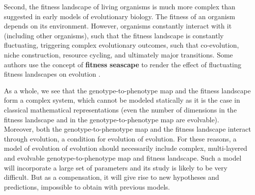 Second, the fitness landscape of living organisms is much more complex than suggested in early models of evolutionary biology. The fitness of an organism depends on its environment. However, organisms constantly interact with it (including other organisms), such that the fitness landscape is constantly fluctuating, triggering complex evolutionary outcomes, such that co-evolution, niche construction, resource cycling, and ultimately major transitions. Some authors use the concept of \textbf{fitness seascape} to render the effect of fluctuating fitness landscapes on evolution \citep{mustonen-lassig-2009}.

As a whole, we see that the genotype-to-phenotype map and the fitness landscape form a complex system, which cannot be modeled statically as it is the case in classical mathematical representations \citep{fisher-1930,kauffman-levin-1987} (even the number of dimensions in the fitness landscape and in the genotype-to-phenotype map are evolvable). Moreover, both the genotype-to-phenotype map and the fitness landscape interact through evolution, a condition for evolution of evolution. For these reasons, a model of evolution of evolution should necessarily include complex, multi-layered and evolvable genotype-to-phenotype map and fitness landscape. Such a model will incorporate a large set of parameters and its study is likely to be very difficult. But as a compensation, it will give rise to new hypotheses and predictions, impossible to obtain with previous models.


